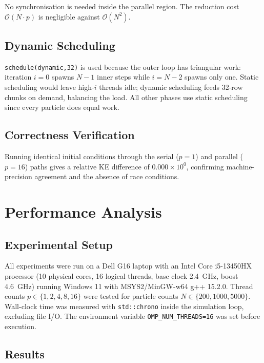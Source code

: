 \documentclass[10pt,twocolumn]{article}
\begin{document}
No synchronisation is needed inside the parallel region.
The reduction cost $\mathcal{O}(N \cdot p)$ is negligible against
$\mathcal{O}(N^2)$.

\subsection{Dynamic Scheduling}

\texttt{schedule(dynamic,32)} is used because the outer loop has triangular
work: iteration $i=0$ spawns $N-1$ inner steps while $i=N-2$ spawns only
one.
Static scheduling would leave high-$i$ threads idle; dynamic scheduling
feeds 32-row chunks on demand, balancing the load.
All other phases use static scheduling since every particle does equal work.

\subsection{Correctness Verification}

Running identical initial conditions through the serial ($p=1$) and parallel
($p=16$) paths gives a relative KE difference of $0.000 \times 10^0$,
confirming machine-precision agreement and the absence of race conditions.

\section{Performance Analysis}

\subsection{Experimental Setup}

All experiments were run on a Dell G16 laptop with an
Intel Core i5-13450HX processor (10 physical cores, 16 logical threads,
base clock \SI{2.4}{GHz}, boost \SI{4.6}{GHz}) running Windows 11 with
MSYS2/MinGW-w64 g++ 15.2.0.
Thread counts $p \in \{1,2,4,8,16\}$ were tested for particle counts
$N \in \{200,1000,5000\}$.
Wall-clock time was measured with \texttt{std::chrono} inside the simulation
loop, excluding file I/O.
The environment variable \texttt{OMP\_NUM\_THREADS=16} was set before
execution.

\subsection{Results}
\end{document}
